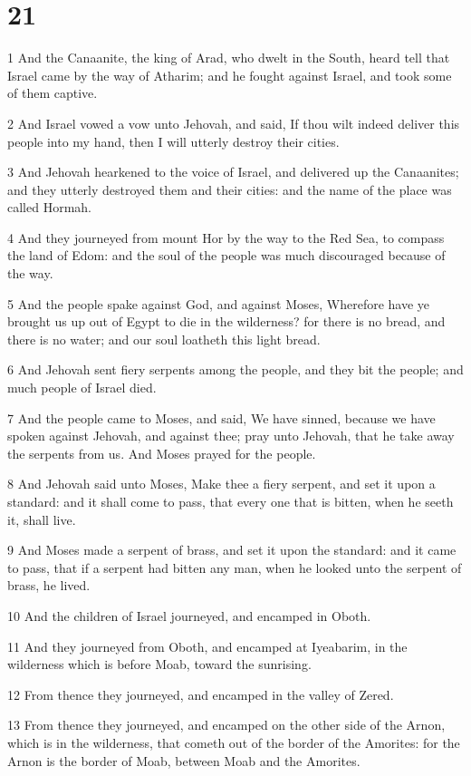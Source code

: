\chapter{21}

\par 1 And the Canaanite, the king of Arad, who dwelt in the South, heard tell that Israel came by the way of Atharim; and he fought against Israel, and took some of them captive.
\par 2 And Israel vowed a vow unto Jehovah, and said, If thou wilt indeed deliver this people into my hand, then I will utterly destroy their cities.
\par 3 And Jehovah hearkened to the voice of Israel, and delivered up the Canaanites; and they utterly destroyed them and their cities: and the name of the place was called Hormah.
\par 4 And they journeyed from mount Hor by the way to the Red Sea, to compass the land of Edom: and the soul of the people was much discouraged because of the way.
\par 5 And the people spake against God, and against Moses, Wherefore have ye brought us up out of Egypt to die in the wilderness? for there is no bread, and there is no water; and our soul loatheth this light bread.
\par 6 And Jehovah sent fiery serpents among the people, and they bit the people; and much people of Israel died.
\par 7 And the people came to Moses, and said, We have sinned, because we have spoken against Jehovah, and against thee; pray unto Jehovah, that he take away the serpents from us. And Moses prayed for the people.
\par 8 And Jehovah said unto Moses, Make thee a fiery serpent, and set it upon a standard: and it shall come to pass, that every one that is bitten, when he seeth it, shall live.
\par 9 And Moses made a serpent of brass, and set it upon the standard: and it came to pass, that if a serpent had bitten any man, when he looked unto the serpent of brass, he lived.
\par 10 And the children of Israel journeyed, and encamped in Oboth.
\par 11 And they journeyed from Oboth, and encamped at Iyeabarim, in the wilderness which is before Moab, toward the sunrising.
\par 12 From thence they journeyed, and encamped in the valley of Zered.
\par 13 From thence they journeyed, and encamped on the other side of the Arnon, which is in the wilderness, that cometh out of the border of the Amorites: for the Arnon is the border of Moab, between Moab and the Amorites.
